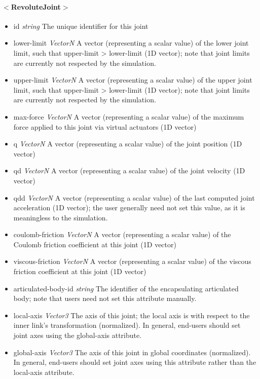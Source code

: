 \documentclass{article}
\begin{document}
\begin{landscape}
\begin{itemize}
\paragraph{$<$RevoluteJoint$>$}
\begin{itemize}
 \item id  \emph{string}  The unique identifier for this joint
 \item lower-limit  \emph{VectorN}  A vector (representing a scalar value) of the lower joint limit, such that upper-limit > lower-limit (1D vector); note that joint limits are currently not respected by the simulation.
 \item upper-limit  \emph{VectorN}  A vector (representing a scalar value) of the upper joint limit, such that upper-limit > lower-limit (1D vector); note that joint limits are currently not respected by the simulation.
 \item max-force  \emph{VectorN}  A vector (representing a scalar value) of the maximum force applied to this joint via virtual actuators (1D vector)
 \item q  \emph{VectorN}  A vector (representing a scalar value) of the joint position (1D vector)
 \item qd  \emph{VectorN}  A vector (representing a scalar value) of the joint velocity (1D vector)
 \item qdd  \emph{VectorN}  A vector (representing a scalar value) of the last computed joint acceleration (1D vector); the user generally need not set this value, as it is meaningless to the simulation.
 \item coulomb-friction  \emph{VectorN}  A vector (representing a scalar value) of the Coulomb friction coefficient at this joint (1D vector)
 \item viscous-friction  \emph{VectorN}  A vector (representing a scalar value) of the viscous friction coefficient at this joint (1D vector)
 \item articulated-body-id  \emph{string} The identifier of the encapsulating articulated body; note that users need not set this attribute manually.
\item local-axis  \emph{Vector3} The axis of this joint; the local axis is with respect to the inner link's transformation (normalized).  In general, end-users should set joint axes using the global-axis attribute.
\item global-axis  \emph{Vector3} The axis of this joint in global coordinates (normalized).  In general, end-users should set joint axes using this attribute rather than the local-axis attribute.

\end{itemize}
\end{itemize}
\end{landscape}
\end{document}
